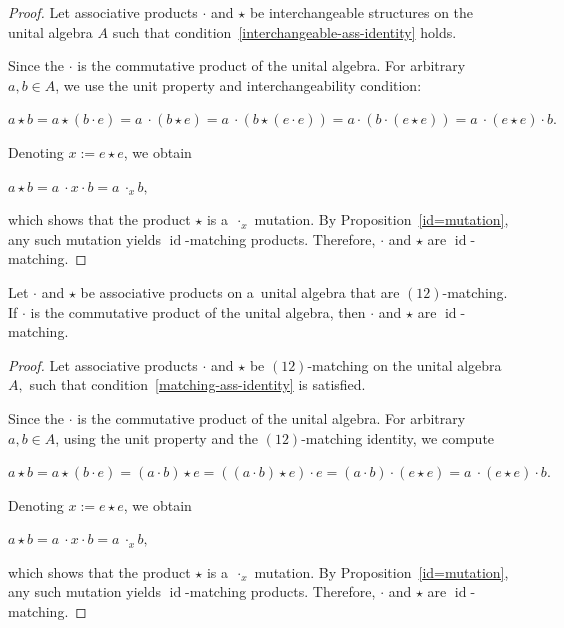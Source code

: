 \documentclass{jonasart}
\DeclareMathOperator{\id}{id}
\begin{document}
	\begin{proof}
		Let associative products $\cdot$ and $\star$ be interchangeable structures on the unital algebra $A$ such that condition~\eqref{interchangeable-ass-identity} holds.

		Since the $\cdot$ is the commutative product of the unital algebra. For arbitrary $a,b \in A$, we use the unit property and interchangeability condition:
		\begin{center}
			$a\star b=a \star (b\cdot e)= a~\cdot (b\star e)= a~\cdot (b\star (e \cdot e))=a \cdot (b \cdot (e \star e))= a~\cdot (e \star e) \cdot b.$
		\end{center}
		Denoting $x:= e \star e$, we obtain
		\begin{center}
			$a \star b = a~\cdot x \cdot b = a~\cdot_x b,$
		\end{center}
		which shows that the product $\star$ is a~$\cdot_x$ mutation. By Proposition~\ref{id=mutation}, any such mutation yields $\id$-matching products. Therefore, $\cdot$ and $\star$ are $\id$-matching.
	\end{proof}

	\begin{lemma}\label{12_m utation}
		Let $\cdot$ and $\star$ be associative products on a~unital algebra that are $(12)$-matching. If $\cdot$ is the commutative product of the unital algebra, then $\cdot$ and $\star$ are $\id$-matching.
	\end{lemma}

	\begin{proof}
		Let associative products $\cdot$ and $\star$ be $(12)$-matching on the unital algebra $A,$ such that condition~\eqref{matching-ass-identity} is satisfied.

		Since the $\cdot$ is the commutative product of the unital algebra. For arbitrary $a,b \in A$, using the unit property and the $(12)$-matching identity, we compute
		\begin{center}
			$a\star b=a \star (b\cdot e)= (a \cdot b) \star e = ((a \cdot b) \star e) \cdot e = (a \cdot b) \cdot (e \star e)= a~\cdot (e \star e) \cdot b.$
		\end{center}
		Denoting $x:= e \star e$, we obtain
		\begin{center}
			$a \star b = a~\cdot x \cdot b = a~\cdot_x b,$
		\end{center}
		which shows that the product $\star$ is a~$\cdot_x$ mutation. By Proposition~\ref{id=mutation}, any such mutation yields $\id$-matching products. Therefore, $\cdot$ and $\star$ are $\id$-matching.
	\end{proof}
\end{document}

